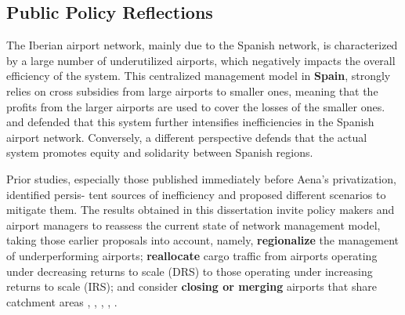 \subsection{Public Policy Reflections}

The Iberian airport network, mainly due to the Spanish network, is characterized by a large number of underutilized airports, which negatively impacts the overall efficiency of
the system. This centralized management model in \textbf{Spain}, strongly relies on cross subsidies from large
airports to smaller ones, meaning that the profits from the larger airports are used to cover the losses
of the smaller ones. \cite{nerja2021} and \cite{cifuentes-faura2023} defended that this system further intensifies inefficiencies in the Spanish airport network. Conversely,
a different perspective defends that the actual system promotes equity and solidarity between Spanish
regions.

Prior studies, especially those published immediately before Aena’s privatization, identified persis-
tent sources of inefficiency and proposed different scenarios to mitigate them. The results obtained
in this dissertation invite policy makers and airport managers to reassess the current state of network
management model, taking those earlier proposals into account, namely, \textbf{regionalize} the management of underperforming airports;  \textbf{reallocate} cargo traffic from airports operating under decreasing returns to
scale (DRS) to those operating under increasing returns to scale (IRS); and consider  \textbf{closing or merging} airports that share catchment areas \cite{martin2001}, \cite{martin2011}, \cite{ripoll-zarraga2020}, \cite{nerja2021}, \cite{cifuentes-faura2023}.

